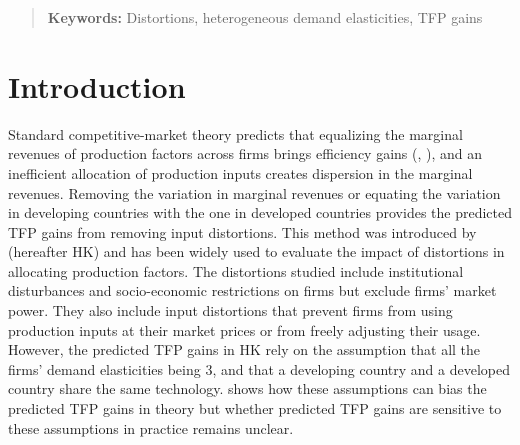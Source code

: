 \documentclass[12pt]{article}
\begin{document}
\begin{titlepage}
\begin{abstract}


\vspace{0in}
\noindent\textbf{Keywords:} Distortions, heterogeneous demand elasticities, TFP gains\\

\end{abstract}
\setcounter{page}{0}
\thispagestyle{empty}

\end{titlepage}
\pagebreak \newpage

\onehalfspacing
\section{Introduction} \label{sec:introduction}
Standard competitive-market theory predicts that equalizing the marginal revenues of production factors across firms brings efficiency gains (\citet{melitz_impact_2003}, \citet{restucciaPolicyDistortionsAggregate2008}), and an inefficient allocation of production inputs creates dispersion in the marginal revenues. Removing the variation in marginal revenues  or equating the variation in developing countries with the one in developed countries provides the predicted TFP gains from removing input distortions. This method was introduced by \citet{hsiehMisallocationManufacturingTFP2009} (hereafter HK) and has been widely used to evaluate the impact of distortions in allocating production factors. The distortions studied include institutional disturbances and socio-economic restrictions on firms but exclude firms' market power. They also include input distortions that prevent firms from using production inputs at their market prices or from freely adjusting their usage. However, the predicted TFP gains in HK rely on the assumption that all the firms' demand elasticities being 3, and that a developing country and a developed country share the same technology. \citet{NBERw24199} shows how these assumptions can bias the predicted TFP gains in theory but whether predicted TFP gains are sensitive to these assumptions in practice remains unclear. 
\end{document}

